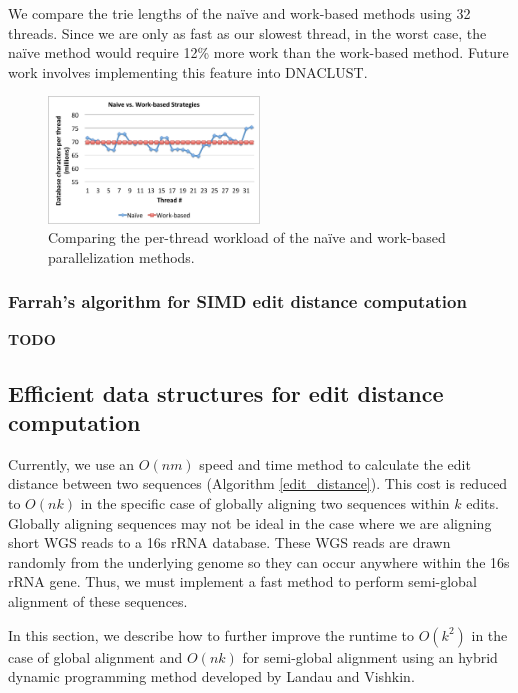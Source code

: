 We compare the trie lengths of the na\"ive and work-based methods using 32 threads.
Since we are only as fast as our slowest thread, in the worst case, the na\"ive method would require 12\% more work than the work-based method.
Future work involves implementing this feature into DNACLUST.

\begin{figure}[tb]
  \centering
    \includegraphics[width=0.5\textwidth]{naive_vs_work_strategy}
  \caption{Comparing the per-thread workload of the na\"ive and work-based parallelization methods.}
  \label{fig:naive_vs_work_strategy}
\end{figure}


\subsubsection{Farrah’s algorithm for SIMD edit distance computation}

{\bf TODO}

\subsection{Efficient data structures for edit distance computation}

Currently, we use an $O(nm)$ speed and time method to calculate the edit distance between two sequences (Algorithm \ref{edit_distance}).
This cost is reduced to $O(nk)$ in the specific case of globally aligning two sequences within $k$ edits.
Globally aligning sequences may not be ideal in the case where we are aligning short WGS reads to a 16s rRNA database.
These WGS reads are drawn randomly from the underlying genome so they can occur anywhere within the 16s rRNA gene.
Thus, we must implement a fast method to perform semi-global alignment of these sequences.

In this section, we describe how to further improve the runtime to $O(k^2)$ in the case of global alignment and $O(nk)$ for semi-global alignment using an hybrid dynamic programming method developed by Landau and Vishkin\cite{landau_introducing_1986}.

